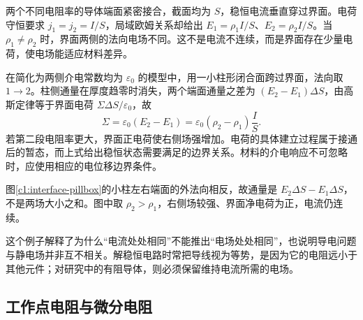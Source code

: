 两个不同电阻率的导体端面紧密接合，截面均为 $S$，稳恒电流垂直穿过界面。电荷守恒要求 $j_1=j_2=I/S$，局域欧姆关系却给出 $E_1=\rho_1I/S$、$E_2=\rho_2I/S$。当 $\rho_1\ne\rho_2$ 时，界面两侧的法向电场不同。这不是电流不连续，而是界面存在少量电荷，使电场能适应材料差异。

在简化为两侧介电常数均为 $\varepsilon_0$ 的模型中，用一小柱形闭合面跨过界面，法向取 $1\to2$。柱侧通量在厚度趋零时消失，两个端面通量之差为 $(E_2-E_1)\Delta S$，由高斯定律等于界面电荷 $\Sigma\Delta S/\varepsilon_0$，故
\[
 \Sigma=\varepsilon_0(E_2-E_1)
 =\varepsilon_0(\rho_2-\rho_1)\frac IS.
\]
若第二段电阻率更大，界面正电荷使右侧场强增加。电荷的具体建立过程属于接通后的暂态，而上式给出稳恒状态需要满足的边界关系。材料的介电响应不可忽略时，应使用相应的电位移边界条件。

图\ref{c1:interface-pillbox}的小柱左右端面的外法向相反，故通量是 $E_2\Delta S-E_1\Delta S$，不是两场大小之和。图中取 $\rho_2>\rho_1$，右侧场较强、界面净电荷为正，电流仍连续。

这个例子解释了为什么“电流处处相同”不能推出“电场处处相同”，也说明导电问题与静电场并非互不相关。解稳恒电路时常把导线视为等势，是因为它的电阻远小于其他元件；对研究中的有阻导体，则必须保留维持电流所需的电场。



\subsection{工作点电阻与微分电阻}

